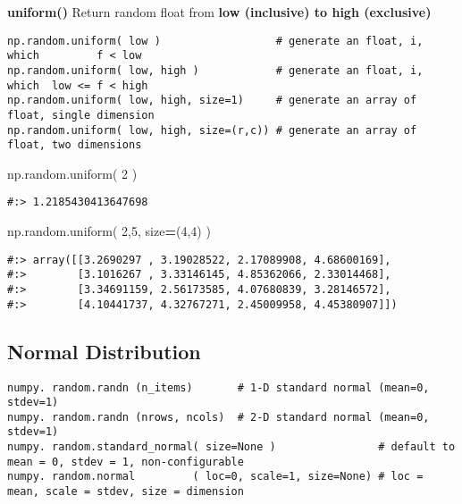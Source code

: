 \documentclass[
]{book}
\newenvironment{Shaded}{\begin{snugshade}}{\end{snugshade}}
\newcommand{\DecValTok}[1]{\textcolor[rgb]{0.06,0.06,0.06}{#1}}
\newcommand{\NormalTok}[1]{#1}
\newcommand{\OperatorTok}[1]{\textcolor[rgb]{0.43,0.43,0.43}{\textbf{#1}}}
\begin{document}
\textbf{uniform()} Return random float from \textbf{low (inclusive) to high (exclusive)}

\begin{verbatim}
np.random.uniform( low )                  # generate an float, i, which         f < low
np.random.uniform( low, high )            # generate an float, i, which  low <= f < high
np.random.uniform( low, high, size=1)     # generate an array of float, single dimension
np.random.uniform( low, high, size=(r,c)) # generate an array of float, two dimensions 
\end{verbatim}

\begin{Shaded}
\begin{Highlighting}[]
\NormalTok{np.random.uniform( }\DecValTok{2}\NormalTok{ )}
\end{Highlighting}
\end{Shaded}

\begin{verbatim}
#:> 1.2185430413647698
\end{verbatim}

\begin{Shaded}
\begin{Highlighting}[]
\NormalTok{np.random.uniform( }\DecValTok{2}\NormalTok{,}\DecValTok{5}\NormalTok{, size}\OperatorTok{=}\NormalTok{(}\DecValTok{4}\NormalTok{,}\DecValTok{4}\NormalTok{) )}
\end{Highlighting}
\end{Shaded}

\begin{verbatim}
#:> array([[3.2690297 , 3.19028522, 2.17089908, 4.68600169],
#:>        [3.1016267 , 3.33146145, 4.85362066, 2.33014468],
#:>        [3.34691159, 2.56173585, 4.07680839, 3.28146572],
#:>        [4.10441737, 4.32767271, 2.45009958, 4.45380907]])
\end{verbatim}

\hypertarget{normal-distribution}{%
\subsection{Normal Distribution}\label{normal-distribution}}

\begin{verbatim}
numpy. random.randn (n_items)       # 1-D standard normal (mean=0, stdev=1)
numpy. random.randn (nrows, ncols)  # 2-D standard normal (mean=0, stdev=1)
numpy. random.standard_normal( size=None )                # default to mean = 0, stdev = 1, non-configurable
numpy. random.normal         ( loc=0, scale=1, size=None) # loc = mean, scale = stdev, size = dimension
\end{verbatim}
\end{document}
